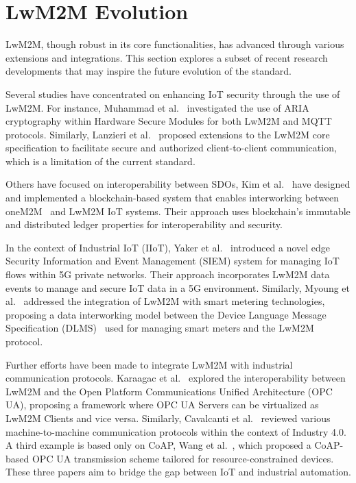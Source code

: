 \documentclass[11pt,sigconf]{iabart}
\begin{document}
\section{LwM2M Evolution} \label{extensions}

LwM2M, though robust in its core functionalities, has advanced through various extensions and integrations. This section explores a subset of recent research developments that may inspire the future evolution of the standard.

Several studies have concentrated on enhancing IoT security through the use of LwM2M. For instance, Muhammad et al.~\cite{pop00001} investigated the use of ARIA cryptography within Hardware Secure Modules for both LwM2M and MQTT protocols. Similarly, Lanzieri et al.~\cite{pop00011} proposed extensions to the LwM2M core specification to facilitate secure and authorized client-to-client communication, which is a limitation of the current standard.

Others have focused on interoperability between SDOs, Kim et al.~\cite{pop00007} have designed and implemented a blockchain-based system that enables interworking between oneM2M~\cite{oneM2M-spec} and LwM2M IoT systems. Their approach uses blockchain's immutable and distributed ledger properties for interoperability and security. 

In the context of Industrial IoT (IIoT), Yaker et al.~\cite{pop00004} introduced a novel edge Security Information and Event Management (SIEM) system for managing IoT flows within 5G private networks. Their approach incorporates LwM2M data events to manage and secure IoT data in a 5G environment. Similarly, Myoung et al.~\cite{pop00012} addressed the integration of LwM2M with smart metering technologies, proposing a data interworking model between the Device Language Message Specification (DLMS)~\cite{dlms-spec} used for managing smart meters and the LwM2M protocol.

Further efforts have been made to integrate LwM2M with industrial communication protocols. Karaagac et al.~\cite{pop00013} explored the interoperability between LwM2M and the Open Platform Communications Unified Architecture (OPC UA), proposing a framework where OPC UA Servers can be virtualized as LwM2M Clients and vice versa. Similarly, Cavalcanti et al.~\cite{pop00014} reviewed various machine-to-machine communication protocols within the context of Industry 4.0. A third example is based only on CoAP, Wang et al.~\cite{pop00015}, which proposed a CoAP-based OPC UA transmission scheme tailored for resource-constrained devices. These three papers aim to bridge the gap between IoT and industrial automation.
\end{document}
